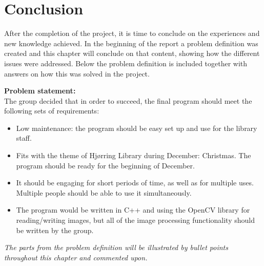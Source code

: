 \chapter{Conclusion}
After the completion of the project, it is time to conclude on the experiences and new knowledge achieved. In the beginning of the report a problem definition was created and this chapter will conclude on that content, showing how the different issues were addressed. Below the problem definition is included together with answers on how this was solved in the project.

\textbf{Problem statement:}\\
The group decided that in order to succeed, the final program should meet the following sets of requirements:
\begin{itemize}
\item Low maintenance: the program should be easy set up and use for the library staff.
\item Fits with the theme of Hj{\o}rring Library during December: Christmas. The program should be ready for the beginning of December.
\item It should be engaging for short periods of time, as well as for multiple uses. Multiple people should be able to use it simultaneously.
\item The program would be written in C++ and using the OpenCV library for reading/writing images, but all of the image processing functionality should be written by the group.
\end{itemize}
\textit{The parts from the problem definition will be illustrated by bullet points throughout this chapter and commented upon.}


